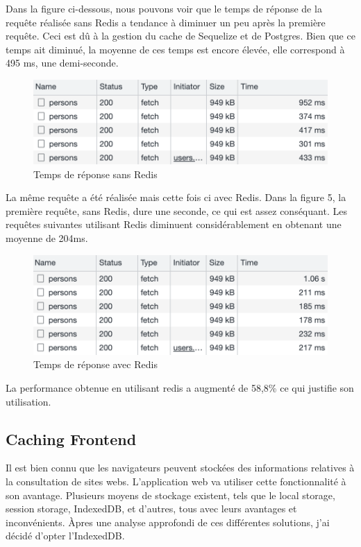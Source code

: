 Dans la figure ci-dessous, nous pouvons voir que le temps de réponse de la requête réalisée sans Redis a tendance à diminuer un peu après la première requête. Ceci est dû à la gestion du cache de Sequelize et de Postgres. Bien que ce temps ait diminué, la moyenne de ces temps est encore élevée, elle correspond à 495 ms, une demi-seconde.
\begin{figure}[H]
    \centering
    \includegraphics[scale=0.7]{img/sans-redis.png}
    \caption{Temps de réponse sans Redis}
    \label{Sans-Redis}
  \end{figure}
La même requête a été réalisée mais cette fois ci avec Redis. Dans la figure 5, la première requête, sans Redis, dure une seconde, ce qui est assez conséquant. Les requêtes suivantes utilisant Redis diminuent considérablement en obtenant une moyenne de 204ms.
\begin{figure}[H]
    \centering
    \includegraphics[scale=0.7]{img/avec-redis.png}
    \caption{Temps de réponse avec Redis}
    \label{Avec-Redis}
\end{figure}
La performance obtenue en utilisant redis a augmenté de 58,8\% ce qui justifie son utilisation.

\subsection{Caching Frontend}
Il est bien connu que les navigateurs peuvent stockées des informations relatives à la consultation de sites webs. L'application web va utiliser cette fonctionnalité à son avantage.
Plusieurs moyens de stockage existent, tels que le local storage, session storage, IndexedDB, et d'autres, tous avec leurs avantages et inconvénients. 
Àpres une analyse approfondi de ces différentes solutions, j'ai décidé d'opter l'IndexedDB. 
